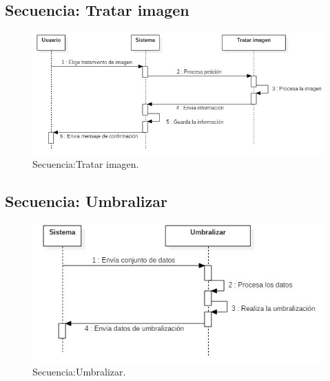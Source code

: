 \documentclass[12pt]{report}
\begin{document}
\subsection{Secuencia: Tratar imagen}
\begin{figure}[H]
\centering
\includegraphics[width = 12 cm, height = 7 cm]{tratamiento}
\caption{Secuencia:Tratar imagen.}
\end{figure}

\subsection{Secuencia: Umbralizar}
\begin{figure}[H]
\centering
\includegraphics[width = 12 cm, height = 7 cm]{umbralizacion}
\caption{Secuencia:Umbralizar.}
\end{figure}
\end{document}
